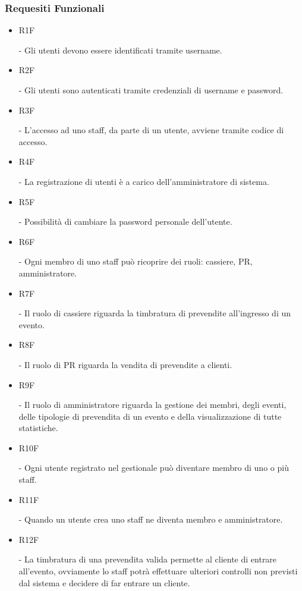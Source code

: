 \documentclass[a4paper]{article}
\begin{document}
\subsubsection{Requesiti Funzionali}

\begin{itemize}
	
	\item \hypertarget{R1F}{R1F} - Gli utenti devono essere identificati tramite username.
	
	\item \hypertarget{R2F}{R2F} - Gli utenti sono autenticati tramite credenziali di username e password.
	\item \hypertarget{R3F}{R3F} - L'accesso ad uno staff, da parte di un utente, avviene tramite codice di accesso.	

	\item \hypertarget{R4F}{R4F} - La registrazione di utenti è a carico dell'amministratore di sistema.
	\item \hypertarget{R5F}{R5F} - Possibilità di cambiare la password personale dell'utente.
		
	\item \hypertarget{R6F}{R6F} - Ogni membro di uno staff può ricoprire dei ruoli: cassiere, PR, amministratore.	
	\item \hypertarget{R7F}{R7F} - Il ruolo di cassiere riguarda la timbratura di prevendite all'ingresso di un evento.
	\item \hypertarget{R8F}{R8F} - Il ruolo di PR riguarda la vendita di prevendite a clienti.
	\item \hypertarget{R9F}{R9F} - Il ruolo di amministratore riguarda la gestione dei membri, degli eventi, delle tipologie di prevendita di un evento e della visualizzazione di tutte statistiche.
	
	\item \hypertarget{R10F}{R10F} - Ogni utente registrato nel gestionale può diventare membro di uno o più staff. 
	
	
	\item \hypertarget{R11F}{R11F} - Quando un utente crea uno staff ne diventa membro e amministratore.
	
	\item \hypertarget{R12F}{R12F} - La timbratura di una prevendita valida permette al cliente di entrare all'evento, ovviamente lo staff potrà effettuare ulteriori controlli non previsti dal sistema e decidere di far entrare un cliente.
	

\end{itemize}
\end{document}
